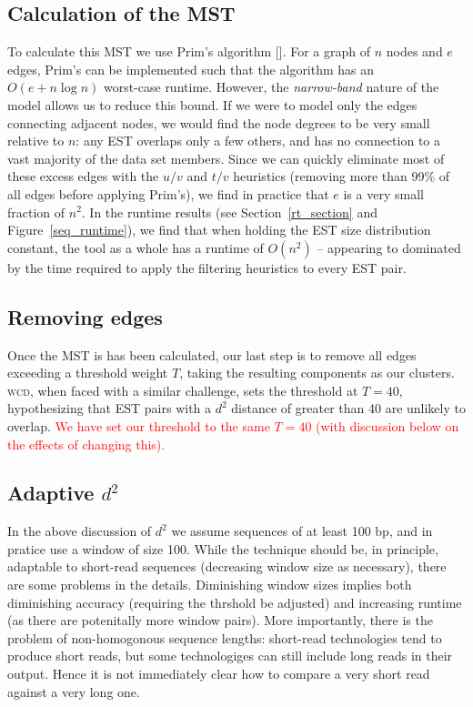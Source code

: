 \documentclass[a4paper,12pt]{article}
\newcommand{\mc}[1]{\textcolor{red}{#1}}
\begin{document}
\begin{appendix}
\subsection{Calculation of the MST}

To calculate this MST we use Prim's algorithm [\cite{Prim57}].  For a
graph of $n$ nodes and $e$ edges, Prim's can be implemented such that
the algorithm has an $O(e + n \log n)$ worst-case runtime.  However,
the {\it narrow-band} nature of the model allows us to reduce this
bound.  If we were to model only the edges connecting adjacent nodes,
we would find the node degrees to be very small relative to $n$: any
EST overlaps only a few others, and has no connection to a vast
majority of the data set members.  Since we can quickly eliminate most
of these excess edges with the $u/v$ and $t/v$ heuristics (removing
more than 99\% of all edges before applying Prim's), we find in
practice that $e$ is a very small fraction of $n^2$.  In the
runtime results (see Section~\ref{rt_section} and
Figure~\ref{seq_runtime}), we find that when holding the EST size
distribution constant, the tool as a whole has a runtime of $O(n^2)$
-- appearing to dominated by the time required to apply
the filtering heuristics to every EST pair.

\subsection{Removing edges}

Once the MST is has been calculated, our last step is to remove all
edges exceeding a threshold weight $T$, taking the resulting
components as our clusters.  \textsc{wcd}, when faced with a similar
challenge, sets the threshold at $T=40$, hypothesizing that EST pairs
with a $d^2$ distance of greater than 40 are unlikely to overlap.  \mc{We
have set our threshold to the same $T=40$ (with discussion below on
the effects of changing this).}

\subsection{Adaptive $d^2$}

In the above discussion of $d^2$ we assume sequences of at least 100
bp, and in pratice use a window of size 100.  While the technique
should be, in principle, adaptable to short-read sequences (decreasing
window size as necessary), there are some problems in the details.
Diminishing window sizes implies both diminishing accuracy (requiring
the thrshold be adjusted) and increasing runtime (as there are
potenitally more window pairs).  More importantly, there is the
problem of non-homogonous sequence lengths: short-read technologies
tend to produce short reads, but some technologiges can still include
long reads in their output.  Hence it is not immediately clear how to
compare a very short read against a very long one.


\end{appendix}
\end{document}
